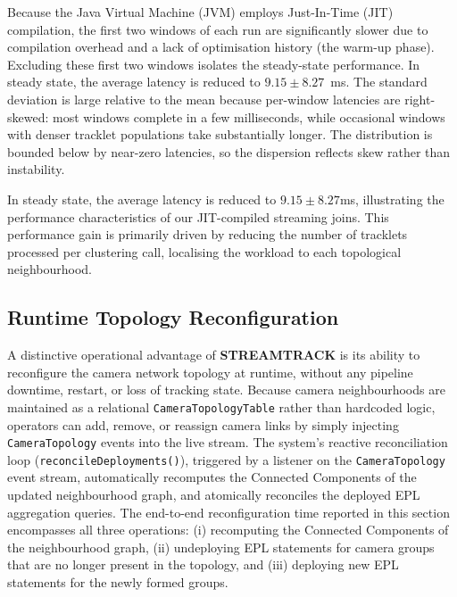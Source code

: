 \documentclass[review]{elsarticle}
\begin{document}
Because the Java Virtual Machine (JVM) employs Just-In-Time (JIT) compilation, the first two windows of each run are significantly slower due to compilation overhead and a lack of optimisation history (the warm-up phase). Excluding these first two windows isolates the steady-state performance. In steady state, the average latency is reduced to $9.15 \pm 8.27$~ms. The standard deviation is large relative to the mean because per-window latencies are right-skewed: most windows complete in a few milliseconds, while occasional windows with denser tracklet populations take substantially longer. The distribution is bounded below by near-zero latencies, so the
dispersion reflects skew rather than instability.

In steady state, the average latency is reduced to $9.15 \pm 8.27$ms, illustrating the performance characteristics of our JIT-compiled streaming joins. This performance gain is primarily driven by reducing the number of tracklets processed per clustering call, localising the workload to each topological neighbourhood.

\subsection{Runtime Topology Reconfiguration}
\label{sec:eval:reconfig}

A distinctive operational advantage of \textbf{STREAMTRACK} is its ability to reconfigure the camera network topology at runtime, without any pipeline downtime, restart, or loss of tracking state. Because camera neighbourhoods are maintained as a relational \texttt{CameraTopologyTable} rather than hardcoded logic, operators can add, remove, or reassign camera links by simply injecting \texttt{CameraTopology} events into the live stream. The system's reactive reconciliation loop (\texttt{reconcileDeployments()}), triggered by a listener on the \texttt{CameraTopology} event stream, automatically recomputes the Connected Components of the updated neighbourhood graph, and atomically reconciles the deployed EPL aggregation queries. The end-to-end reconfiguration time reported in this section encompasses all three operations: (i) recomputing the Connected Components of the neighbourhood graph, (ii) undeploying EPL statements for camera groups that are no longer present in the topology, and (iii) deploying new EPL statements for the newly formed groups.
\end{document}
